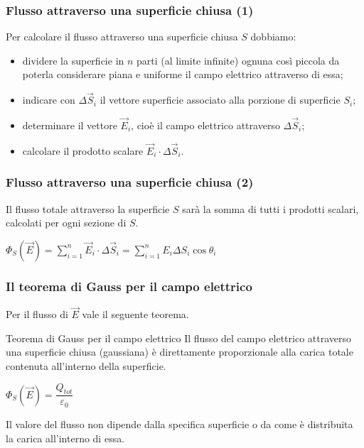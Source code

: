 \documentclass[]{beamer}
\theoremstyle{plain}
\begin{document}
\begin{frame}
  \frametitle{Flusso attraverso una superficie chiusa (1)}
  Per calcolare il flusso attraverso una superficie chiusa $ S $ dobbiamo:
  \begin{itemize}
    \item dividere la superficie in $ n $ parti (al limite infinite) ognuna così piccola da poterla considerare \alert<1>{piana} e \alert<1>{uniforme} il campo elettrico attraverso di essa;\pause
    \item indicare con $ \Delta \vec{S}_i $ il \alert<2>{vettore superficie} associato alla porzione di superficie $ S_i $;\pause
    \item determinare il vettore $ \vec{E}_i $, cioè il \alert<3>{campo elettrico attraverso $ \Delta \vec{S}_i $};\pause
    \item calcolare il \alert<4>{prodotto scalare} $ \vec{E}_i \cdot \Delta \vec{S}_i $.
  \end{itemize}
\end{frame}

\begin{frame}
  \frametitle{Flusso attraverso una superficie chiusa (2)}
  Il flusso totale attraverso la superficie $ S $ sarà la \alert<1>{somma di tutti i prodotti scalari}, calcolati per ogni sezione di $ S $.
   \begin{center}
   \colorbox{blue!30}{$ \Phi_S (\vec{E}) = \sum\limits_{i=1}^n \vec{E}_i \cdot \Delta \vec{S}_i =  \sum\limits_{i=1}^n E_i \Delta S_i \cos\theta_i $}
   \end{center}
\end{frame}




\begin{frame}
  \frametitle{Il teorema di Gauss per il campo elettrico}
  Per il flusso di $ \vec{E} $ vale il seguente teorema.
  \begin{block}{Teorema di Gauss per il campo elettrico}
    Il flusso del campo elettrico attraverso una superficie chiusa (gaussiana) è direttamente proporzionale alla carica totale contenuta all'interno della superficie.
    \begin{center}
   \colorbox{blue!30}{$ \Phi_S (\vec{E}) = \dfrac{Q_{tot}}{\varepsilon_0} $}
   \end{center}
  \end{block}\pause
  Il valore del flusso non dipende dalla specifica superficie o da come è distribuita la carica all'interno di essa.
\end{frame}
\end{document}

